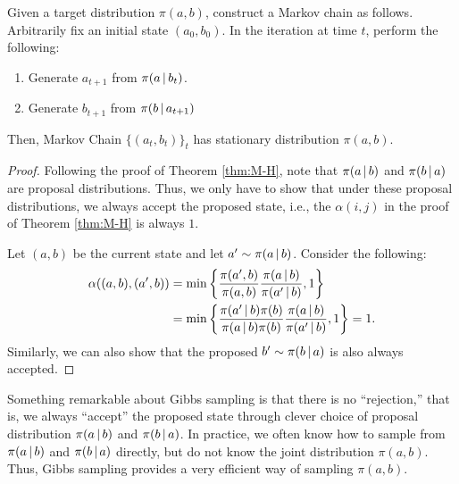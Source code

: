 \documentclass[a4paper,12pt]{article}
\begin{document}
\begin{theorem}\label{thm:gibbs}
	Given a target distribution $\pi(a,b)$,
	construct a Markov chain as follows.
	Arbitrarily fix an initial state $(a_0,b_0)$.
	In the iteration at time $t$, perform the following:
	\begin{enumerate}
		\item
			Generate $a_{t+1}$ from $\pi(a\,|\, b_{t})$.
		\item
			Generate $b_{t+1}$ from $\pi(b\,|\, a_{t+1})$
	\end{enumerate}
	Then, Markov Chain $\{(a_{t},b_{t})\}_{t}$ has stationary distribution $\pi(a,b)$.
\end{theorem}
\begin{proof}
	Following the proof of Theorem \ref{thm:M-H},
	note that $\pi(a\,|\, b)$ and $\pi(b\,|\, a)$ are proposal distributions.
	Thus, we only have to show that under these proposal distributions, 
	we always accept the proposed state, i.e., the $\alpha(i,j)$ in the proof of Theorem \ref{thm:M-H} is always $1$.

	Let $(a,b)$ be the current state and let $a'\sim\pi(a\,|\, b)$.
	Consider the following:
	\begin{align*}
		\alpha((a,b),(a',b))
		&= \min\left\{\frac{\pi(a',b)}{\pi(a,b)}\frac{\pi(a\,|\, b)}{\pi(a'\,|\, b)},1\right\} \\
		&= \min\left\{\frac{\pi(a'\,|\, b)\pi(b)}{\pi(a\,|\, b)\pi(b)}\frac{\pi(a\,|\, b)}{\pi(a'\,|\, b)},1\right\}
		= 1.
	\end{align*}
	Similarly, we can also show that the proposed $b'\sim\pi(b\,|\, a)$ is also always accepted.
\end{proof}

\begin{remark}
	Something remarkable about Gibbs sampling is that there is no ``rejection,''
	that is, we always ``accept'' the proposed state through clever choice of proposal distribution $\pi(a\,|\, b)$ and $\pi(b\,|\, a)$.
	In practice, we often know how to sample from $\pi(a\,|\, b)$ and $\pi(b\,|\, a)$ directly, but do not know the joint distribution $\pi(a,b)$.
	Thus, Gibbs sampling provides a very efficient way of sampling $\pi(a,b)$.
\end{remark}
\end{document}
